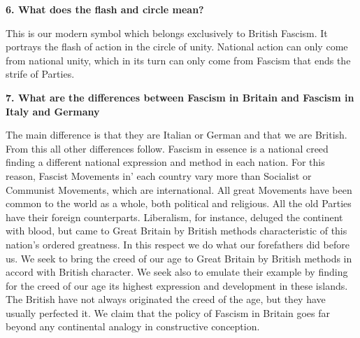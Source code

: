 \documentclass{book}
\begin{document}
\begin{flushleft}
    \textbf{6. What does the flash and circle mean?}

This is our modern symbol which belongs exclusively to British Fascism. It portrays the flash of
action in the circle of unity. National action can only come from national unity, which in its turn can only come from Fascism that ends the strife
of Parties.
\end{flushleft}
\begin{flushright}
\textbf{7. What are the differences between Fascism in Britain
    and Fascism in Italy and Germany}

The main difference is that they are Italian or German and that we are British. From this all other
differences follow. Fascism in essence is a national creed finding a different national expression
and method in each nation. For this reason, Fascist Movements in' each country vary more than
Socialist or Communist Movements, which are international. All great Movements have been
common to the world as a whole, both political and religious. All the old Parties have their
foreign counterparts. Liberalism, for instance, deluged the continent with blood, but came to
Great Britain by British methods characteristic of this nation's ordered greatness. In this respect
we do what our forefathers did before us. We seek to bring the creed of our age to Great Britain
by British methods in accord with British character. We seek also to emulate their example by
finding for the creed of our age its highest expression and development in these islands. The
British have not always originated the creed of the age, but they have usually perfected it. We
claim that the policy of Fascism in Britain goes far beyond any continental analogy in
constructive conception.
\end{flushright}
\end{document}
